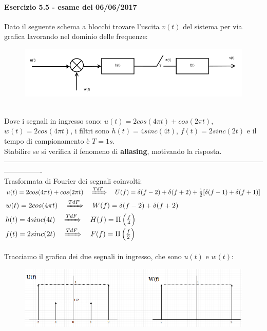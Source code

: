 \documentclass[12pt,a4paper]{article}
\begin{document}
	\paragraph{Esercizio 5.5 - esame del 06/06/2017} Dato il seguente schema a blocchi trovare l’uscita $v(t)$ del sistema per via grafica lavorando nel dominio delle frequenze:
	\begin{figure}[h!]
		\centering
		\includegraphics[scale=0.4]{./images/fourier55_1.png}
	\end{figure}
	\\Dove i segnali in ingresso sono: $u(t) = 2cos(4\pi t) + cos(2\pi t)$, $w(t) = 2cos(4\pi t)$, i filtri sono $h(t) = 4sinc(4t)$, $f(t) = 2 sinc(2t)$ e il tempo di campionamento è $T = 1s$.\\Stabilire se si verifica il fenomeno di \textbf{aliasing}, motivando la risposta.
	\vspace{5px}
	\\
	----------------------------------------------------------------------------------------------------------------------------\\
	Trasformata di Fourier dei segnali coinvolti:\vspace{5px}\\
	$u(t) = 2cos(4\pi t) + cos(2\pi t)\quad\xRightarrow[]{TdF}\quad U(f) = \delta(f-2) + \delta(f + 2) + \frac{1}{2}[\delta(f-1) + \delta(f+1)]$\\
	$w(t) = 2cos(4\pi t)\quad\xRightarrow[]{TdF}\quad W(f) = \delta(f-2) + \delta(f + 2)$\\
	$h(t) = 4sinc(4t)\quad\xRightarrow[]{TdF}\quad H(f) = \Pi\left(\frac{f}{4}\right)$\\
	$f(t) = 2sinc(2t) \quad\xRightarrow[]{TdF}\quad F(f) = \Pi\left(\frac{f}{2}\right)$\\ \\
	Tracciamo il grafico dei due segnali in ingresso, che sono $u(t)$ e $w(t)$:
	\begin{figure}[h!]
		\centering
		\includegraphics[scale=0.4]{./images/fourier55_2.png}
	\end{figure}
\end{document}
